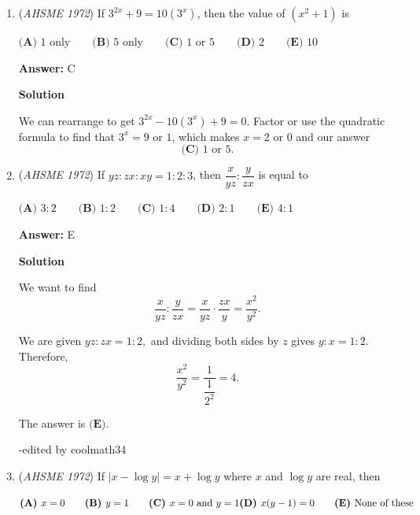 \begin{enumerate}
\textbf{Solution}

$8^{1/8}$ and $9^{1/9}$ are obviously too small. We must then compare $3^{1/3}$ with $2^{1/2}$. Raising both to the power of $6$ gives $9$ and $8$ respectively. Our answer is therefore $\boxed{\textbf{(A) } 3^{1/3},\ 2^{1/2}}.$ ~lopkiloinm

 


	\item (\textit{AHSME 1972}) If $3^{2x}+9=10\left(3^{x}\right)$, then the value of $(x^2+1)$ is 


 $\textbf{(A) }1\text{ only}\qquad \textbf{(B) }5\text{ only}\qquad \textbf{(C) }1\text{ or }5\qquad \textbf{(D) }2\qquad \textbf{(E) }10$

 \textbf{Answer: }C



\textbf{Solution}

We can rearrange to get $3^{2x}-10\left(3^{x}\right)+9=0$. Factor or use the quadratic formula to find that $3^{x}= 9\text{ or }1$, which makes $x = 2\text{ or }0$ and our answer 
 \[\boxed{\textbf{(C) }1\text{ or }5}.\]



	\item (\textit{AHSME 1972}) If $yz:zx:xy=1:2:3$, then $\dfrac{x}{yz}:\dfrac{y}{zx}$ is equal to


 $\textbf{(A) }3:2\qquad \textbf{(B) }1:2\qquad \textbf{(C) }1:4\qquad \textbf{(D) }2:1\qquad  \textbf{(E) }4:1$

 \textbf{Answer: }E



\textbf{Solution}

We want to find
 \[\dfrac{x}{yz}:\dfrac{y}{zx} = \dfrac{x}{yz} \cdot \dfrac{zx}{y} = \dfrac{x^2}{y^2}.\]

 We are given $yz:zx=1:2,$ and dividing both sides by $z$ gives $y:x = 1:2.$ Therefore,
 \[\dfrac{x^2}{y^2} = \dfrac{1}{\dfrac{1}{2^2}} = 4.\]

 The answer is $\textbf{(E)}.$

 -edited by coolmath34

 


	\item (\textit{AHSME 1972}) If $|x-\log y|=x+\log y$ where $x$ and $\log y$ are real, then


 $\textbf{(A) }x=0\qquad \textbf{(B) }y=1\qquad \textbf{(C) }x=0\text{ and }y=1\qquad\\ \textbf{(D) }x(y-1)=0\qquad  \textbf{(E) }\text{None of these}$


\end{enumerate}
